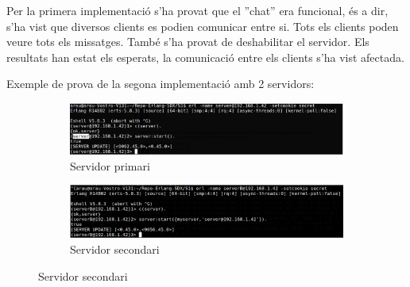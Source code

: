 \documentclass[a4paper, 11pt]{article}
\begin{document}
Per la primera implementació s'ha provat que el ''chat'' era funcional, és a
dir, s'ha vist que diversos clients es podien comunicar entre si. Tots els
clients poden veure tots els missatges.  També s'ha provat de deshabilitar el
servidor. Els resultats han estat els esperats, la comunicació entre els clients
s'ha vist afectada.

Exemple de prova de la segona implementació amb 2 servidors:

\begin{figure}[ht]
    \centering
    \caption{Implementaci\'o 2}
    \begin{subfigure}[b]{0.8\textwidth}
        \caption{Servidor primari}
        \includegraphics[width=1.0\textwidth]{figures/ServerA.png}
    \end{subfigure}
    
    \begin{subfigure}[b]{0.8\textwidth}
        \caption{Servidor secondari}
        \includegraphics[width=1.0\textwidth]{figures/ServerB.png}
    \end{subfigure}    
\end{figure}
\end{document}
